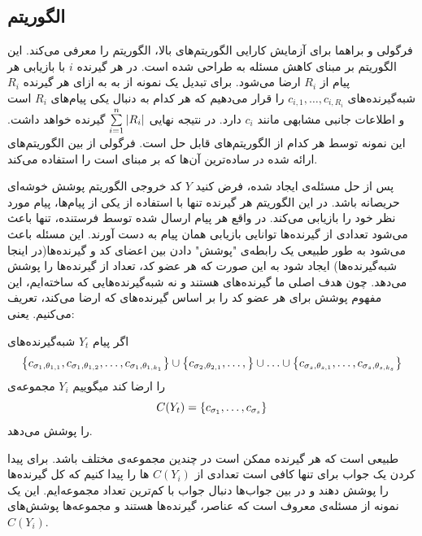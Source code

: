  \subsection{الگوریتم }
 فرگولی و براهما برای آزمایش کارایی الگوریتم‌های بالا، الگوریتم
 را معرفی می‌کند. این الگوریتم بر مبنای کاهش مسئله به
 \icod
 طراحی شده است. در 
 \picod
 هر گیرنده 
 $i$
 با بازیابی هر پیام از
 $R_i$
 ارضا می‌شود. برای تبدیل یک نمونه از
 \picod
 به
 \icod
 به ازای هر گیرنده
 $R_i$
 شبه‌گیرنده‌های
 $c_{i, 1}, \ldots, c_{i, {R_i}}$
 را قرار می‌دهیم که هر کدام به دنبال یکی پیام‌های
 $R_i$
 است و اطلاعات جانبی مشابهی مانند
 $c_i$
 دارد. در نتیجه 
 \icod
 نهایی 
 $\sum\limits_{i = 1}^{n} \left|{R_i}\right|$
 گیرنده خواهد داشت. این نمونه توسط هر کدام از الگوریتم‌های
 \icod
 قابل حل است. فرگولی از بین الگوریتم‌های ارائه شده در
 \cite{25}
 ساده‌ترین آن‌ها که بر مبنای
 است را استفاده می‌کند.
 
 پس از حل مسئله‌ی
 \icod
 ایجاد شده، فرض کنید 
 $Y$
 کد خروجی الگوریتم پوشش خوشه‌ای حریصانه باشد. در این الگوریتم هر گیرنده تنها با استفاده از یکی از پیام‌ها، پیام مورد نظر خود را بازیابی می‌کند. در واقع هر پیام ارسال شده توسط فرستنده، تنها باعث می‌شود تعدادی از گیرنده‌ها توانایی بازیابی همان پیام به دست آورند. این مسئله باعث می‌شود به طور طبیعی یک رابطه‌ی "پوشش" دادن بین اعضای کد و گیرنده‌ها(در اینجا شبه‌گیرنده‌ها) ایجاد شود به این صورت که هر عضو کد، تعداد از گیرنده‌ها را پوشش می‌دهد. چون هدف اصلی ما گیرنده‌های
 \picod
 هستند و نه شبه‌گیرنده‌هایی که ساخته‌ایم، این مفهوم پوشش برای هر عضو کد را بر اساس گیرنده‌های \picod که ارضا می‌کند، تعریف می‌کنیم. یعنی:

 \begin{definition}
 اگر پیام
 $Y_t$
 شبه‌گیرنده‌های
 $$\left\{ c_{\sigma_1, \theta_{1, 1}}, c_{\sigma_1, \theta_{1, 2}},\ldots, c_{\sigma_1, \theta_{1, k_1}} \right\} \cup \left\{ c_{\sigma_2, \theta_{2, 1}}, \ldots, \right\} \cup \ldots \cup \left\{ c_{\sigma_s, \theta_{s, 1}}, \ldots, c_{\sigma_s, \theta_{s, k_s}} \right\}$$
 را ارضا کند میگوییم $Y_i$ مجموعه‌ی
 $$C(Y_t) =\left\{  c_{\sigma_1}, \ldots, c_{\sigma_s} \right\}$$
 را پوشش می‌دهد.
\end{definition}
 طبیعی است که هر گیرنده ممکن است در چندین مجموعه‌ی مختلف باشد. برای پیدا کردن یک جواب برای
 \picod
 تنها کافی است تعدادی از 
 $C(Y_i)$
 ها را پیدا کنیم که کل گیرنده‌ها را پوشش دهند و در بین جواب‌ها دنبال جواب با کم‌ترین تعداد مجموعه‌‌ایم. این یک نمونه از مسئله‌ی معروف
 است که عناصر، گیرنده‌ها هستند و مجموعه‌ها پوشش‌های
 $C(Y_i)$.
 
